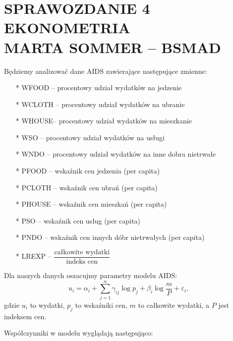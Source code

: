 \documentclass[11pt,a4paper]{report}
\begin{document}
\section*{\centering SPRAWOZDANIE 4 \\ EKONOMETRIA \\ MARTA SOMMER -- BSMAD}

Będziemy analizować dane AIDS zawierające następujące zmienne:
\begin{enumerate}
\item[*] WFOOD -- procentowy udział wydatków na jedzenie\\
\item[*] WCLOTH -- procentowy udział wydatków na ubranie\\
\item[*] WHOUSE-- procentowy udział wydatków na mieszkanie\\
\item[*] WSO -- procentowy udział wydatków na usługi\\
\item[*] WNDO -- procentowy udział wydatków na inne dobra nietrwałe\\
\item[*] PFOOD -- wskaźnik cen jedzenia (per capita)\\
\item[*] PCLOTH -- wskaźnik cen ubrań (per capita)\\
\item[*] PHOUSE -- wskaźnik cen mieszkań (per capita)\\
\item[*] PSO -- wskaźnik cen usług (per capita)\\
\item[*] PNDO -- wskaźnik cen innych dóbr nietrwałych (per capita)\\
\item[*] LREXP -- $\dfrac{\textrm{całkowite wydatki}}{\textrm{indeks cen}}$\\
\end{enumerate}

Dla naszych danych oszacujmy parametry modelu AIDS:
$$
u_i=\alpha_i+\sum_{j=1}^n \gamma_{ij}\log{p_j}+\beta_i\log{\frac{m}{P}}+ \varepsilon_i,
$$
gdzie $u_i$ to wydatki, $p_j$ to wskaźniki cen, $m$ to całkowite wydatki, a $P$ jest indeksem cen.
 
Współczynniki w modelu wyglądają następująco:

\bigskip
\end{document}
